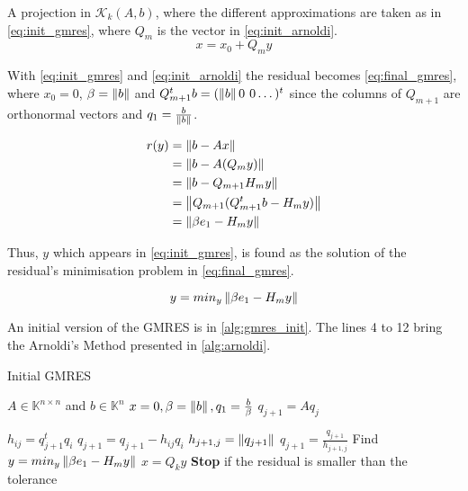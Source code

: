 
A projection in $\mathcal{K}_{k}(A,b)$, where the different approximations are taken as in \ref{eq:init_gmres}, where $Q_{m}$ is the vector in \ref{eq:init_arnoldi}.
\begin{equation}\label{eq:init_gmres}
    x = x_{0} + Q_{m}y
\end{equation}

With \ref{eq:init_gmres} and \ref{eq:init_arnoldi} the residual becomes \ref{eq:final_gmres}, where $x_{0} = 0$, $\beta=\left\lVert b\right\rVert$ and $Q_{m+1}^{t}b=(\left\lVert b\right\rVert 0 \hspace{0.05in} 0\dots)^{t}$ since the columns of $Q_{m+1}$ are orthonormal vectors and $q_{1} = \frac{b}{\left\lVert b\right\rVert}$.

\begin{align} \label{eq:final_gmres}
    \begin{split}
        r(y) &= \left\lVert b - Ax\right\rVert\\
        &= \left\lVert b - A(Q_{m}y)\right\rVert\\
        &= \left\lVert b-Q_{m+1}H_{m}y\right\rVert \\
        &= \left\lVert Q_{m+1}(Q_{m+1}^{t}b-H_{m}y)\right\rVert \\
        &= \left\lVert\beta e_{1} - H_{m}y\right\rVert
    \end{split}
\end{align}


Thus, $y$ which appears in \ref{eq:init_gmres}, is found as the solution of the residual's minimisation problem  in \ref{eq:final_gmres}.

\begin{equation}\label{eq:y_gmres}
    y = min_{y} \left\lVert\beta e_{1} - H_{m}y\right\rVert
\end{equation}

An initial version of the GMRES is in \ref{alg:gmres_init}. The lines 4 to 12 bring the Arnoldi's Method presented in \ref{alg:arnoldi}.

\begin{algorithm}
    \caption{Initial GMRES}\label{alg:gmres_init}
    \begin{algorithmic}[1]
        \State $A \in \mathbb{K}^{n \times n}$ and $b\in \mathbb{K}^{n}$
        \State $x=0, \beta=\left\lVert b\right\rVert,q_{1}=\frac{b}{\beta}$
        \State $q_{j+1} = Aq_{j}$

        \State $h_{ij}= q_{j+1}^{t}q_{i}$
        \State $q_{j+1} = q_{j+1} - h_{ij}q_{i}$
        \EndFor
        \State $h_{j+1,j}=\left\lVert q_{j+1}\right\rVert$
        \State $q_{j+1} = \frac{q_{j+1}}{h_{j+1,j}}$
        \EndFor
        \State Find $y = min_{y} \left\lVert\beta e_{1} - H_{m}y\right\rVert$
        \State $x = Q_{k}y$
        \State \textbf{Stop} if the residual is smaller than the tolerance
        \EndFor
    \end{algorithmic}
\end{algorithm}

